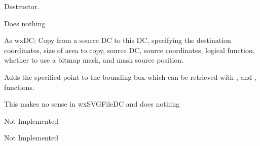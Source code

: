 \label{wxsvgfiledcdtor}


Destructor.

\label{wxsvgfiledcbegindrawing}

Does nothing

\label{wxsvgfiledcblit}


As wxDC: Copy from a source DC to this DC, specifying the destination
coordinates, size of area to copy, source DC, source coordinates,
logical function, whether to use a bitmap mask, and mask source position.

\label{wxsvgfiledccalcboundingbox}


Adds the specified point to the bounding box which can be retrieved with 
,  and 
,  functions.


\label{wxsvgfiledcclear}


This makes no sense in wxSVGFileDC and does nothing


\label{wxsvgfiledccrosshair}


Not Implemented

\label{wxsvgfiledcdestroyclippingregion}


Not Implemented

\label{wxsvgfiledcdevicetologicalx}


